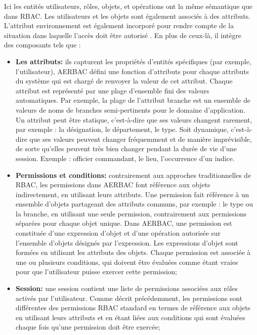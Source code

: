 \label{sectionComposantAERBAC}

Ici les entités utilisateurs, rôles, objets, et opérations ont la même sémantique que dans RBAC. Les utilisateurs et les objets sont également associés à des attributs. L'attribut environnement est également incorporé pour rendre compte de la situation dans laquelle l'accès doit être autorisé . En plus de ceux-là, il intègre des composants tels que \cite{rajpoot15} :

\begin{itemize}
\item \textbf{Les attributs:} ils capturent les propriétés d'entités spécifiques (par exemple, l'utilisateur), AERBAC défini une fonction d'attributs pour chaque attributs du système qui est chargé de renvoyer la valeur de cet attribut. Chaque attribut est représenté par une plage d'ensemble fini des valeurs automatiques. Par exemple, la plage de l'attribut branche est un ensemble de valeurs de noms de branches semi-pertinents pour le domaine d'application. Un attribut peut être statique, c'est-à-dire que ses valeurs changent rarement, par exemple : la désignation, le département, le type. Soit dynamique, c'est-à-dire que ses valeurs peuvent changer fréquemment et de manière imprévisible, de sorte qu'elles peuvent très bien changer pendant la durée de vie d'une session. Exemple : officier commandant, le lieu, l'occurrence d'un indice.
\item \textbf{Permissions et conditions:} contrairement aux approches traditionnelles de RBAC, les permissions dans AERBAC font référence aux objets indirectement, en utilisant leurs attributs. Une permission fait référence à un ensemble d'objets partageant des attributs communs, par exemple : le type ou la branche, en utilisant une seule permission, contrairement aux permissions séparées pour chaque objet unique. Dans AERBAC, une permission est constituée d'une expression d'objet et d'une opération autorisée sur l'ensemble d'objets désignés par l'expression. Les expressions d'objet sont formées en utilisant les attributs des objets. Chaque permission est associée à une ou plusieurs conditions, qui doivent être évaluées comme étant vraies pour que l'utilisateur puisse exercer cette permission;
\item \textbf{Session:} une session contient une liste de permissions associées aux rôles activés par l'utilisateur. Comme décrit précédemment, les permissions sont différentes des permissions RBAC standard en termes de référence aux objets en utilisant leurs attributs et en étant liées aux conditions qui sont évaluées chaque fois qu'une permission doit être exercée;

\end{itemize}
